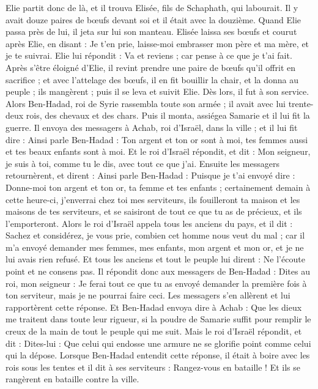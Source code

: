 \begin{multicols}{2}
Elie partit donc de là, et il trouva Elisée, fils de Schaphath, qui labourait. Il y avait douze paires de bœufs devant soi et il était avec la douzième. Quand Elie passa près de lui, il jeta sur lui son manteau.
Elisée laissa ses bœufs et courut après Elie, en disant : Je t'en prie, laisse-moi embrasser mon père et ma mère, et je te suivrai. Elie lui répondit : Va et reviens ; car pense à ce que je t'ai fait.
Après s'être éloigné d'Elie, il revint prendre une paire de bœufs qu'il offrit en sacrifice ; et avec l'attelage des bœufs, il en fit bouillir la chair, et la donna au peuple ; ils mangèrent ; puis il se leva et suivit Elie. Dès lors, il fut à son service.
\VerseOne{}Alors Ben-Hadad, roi de Syrie rassembla toute son armée ; il avait avec lui trente-deux rois, des chevaux et des chars. Puis il monta, assiégea Samarie et il lui fit la guerre.
Il envoya des messagers à Achab, roi d'Israël, dans la ville ;
et il lui fit dire : Ainsi parle Ben-Hadad : Ton argent et ton or sont à moi, tes femmes aussi et tes beaux enfants sont à moi.
Et le roi d'Israël répondit, et dit : Mon seigneur, je suis à toi, comme tu le dis, avec tout ce que j'ai.
Ensuite les messagers retournèrent, et dirent : Ainsi parle Ben-Hadad : Puisque je t'ai envoyé dire : Donne-moi ton argent et ton or, ta femme et tes enfants ;
certainement demain à cette heure-ci, j'enverrai chez toi mes serviteurs, ils fouilleront ta maison et les maisons de tes serviteurs, et se saisiront de tout ce que tu as de précieux, et ils l'emporteront.
Alors le roi d'Israël appela tous les anciens du pays, et il dit : Sachez et considérez, je vous prie, combien cet homme nous veut du mal ; car il m'a envoyé demander mes femmes, mes enfants, mon argent et mon or, et je ne lui avais rien refusé.
Et tous les anciens et tout le peuple lui dirent : Ne l'écoute point et ne consens pas.
Il répondit donc aux messagers de Ben-Hadad : Dites au roi, mon seigneur : Je ferai tout ce que tu as envoyé demander la première fois à ton serviteur, mais je ne pourrai faire ceci. Les messagers s'en allèrent et lui rapportèrent cette réponse.
Et Ben-Hadad envoya dire à Achab : Que les dieux me traitent dans toute leur rigueur, si la poudre de Samarie suffit pour remplir le creux de la main de tout le peuple qui me suit.
Mais le roi d'Israël répondit, et dit : Dites-lui : Que celui qui endosse une armure ne se glorifie point comme celui qui la dépose.
Lorsque Ben-Hadad entendit cette réponse, il était à boire avec les rois sous les tentes et il dit à ses serviteurs : Rangez-vous en bataille ! Et ils se rangèrent en bataille contre la ville.

\end{multicols}
